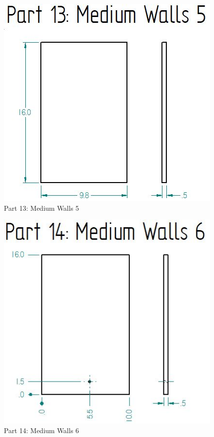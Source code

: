 \documentclass[12pt, titlepage]{article}
\begin{document}
\begin{figure}[H]
    \centerline{\includegraphics[scale=.5]{Part 13.jpg}}
    \caption{Part 13: Medium Walls 5}
    \label{fig}
\end{figure}

\begin{figure}[H]
    \centerline{\includegraphics[scale=.5]{Part 14.jpg}}
    \caption{Part 14: Medium Walls 6}
    \label{fig}
\end{figure}
\end{document}
